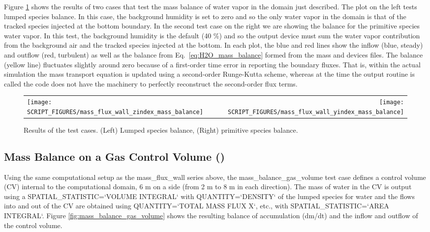 \documentclass[11pt]{book}
\begin{document}
Figure \ref{fig:H2O_mass_balance} shows the results of two cases that test the mass balance of water vapor in the domain just described.  The plot on the left tests lumped species balance.  In this case, the background humidity is set to zero and so the only water vapor in the domain is that of the tracked species injected at the bottom boundary.  In the second test case on the right we are showing the balance for the primitive species water vapor.  In this test, the background humidity is the default (40 \%) and so the output device must sum the water vapor contribution from the background air and the tracked species injected at the bottom.  In each plot, the blue and red lines show the inflow (blue, steady) and outflow (red, turbulent) as well as the balance from Eq.~\ref{eq:H2O_mass_balance} formed from the mass and devices files.  The balance (yellow line) fluctuates slightly around zero because of a first-order time error in reporting the boundary fluxes.  That is, within the actual simulation the mass transport equation is updated using a second-order Runge-Kutta scheme, whereas at the time the output routine is called the code does not have the machinery to perfectly reconstruct the second-order flux terms.

\begin{figure}[ht]
\begin{tabular*}{\textwidth}{lr}
\texttt{[image: SCRIPT\_FIGURES/mass\_flux\_wall\_zindex\_mass\_balance]} &
\texttt{[image: SCRIPT\_FIGURES/mass\_flux\_wall\_yindex\_mass\_balance]}
\end{tabular*}
\caption[The  test cases]{Results of the  test cases.  (Left) Lumped species balance, (Right) primitive species balance.}
\label{fig:H2O_mass_balance}
\end{figure}

\subsection{Mass Balance on a Gas Control Volume (\texorpdfstring{}{mass\_balance\_gas\_volume})}
\label{mass_balance_gas_volume}

Using the same computational setup as the {\ct mass\_flux\_wall} series above, the {\ct mass\_balance\_gas\_volume} test case defines a control volume (CV) internal to the computational domain, 6 m on a side (from 2 m to 8 m in each direction).  The mass of water in the CV is output using a {\ct SPATIAL\_STATISTIC=`VOLUME INTEGRAL`} with {\ct QUANTITY=`DENSITY`} of the lumped species for water and the flows into and out of the CV are obtained using {\ct QUANTITY=`TOTAL MASS FLUX X`}, etc., with {\ct SPATIAL\_STATISTIC=`AREA INTEGRAL`}. Figure \ref{fig:mass_balance_gas_volume} shows the resulting balance of accumulation (dm/dt) and the inflow and outflow of the control volume.
\end{document}
